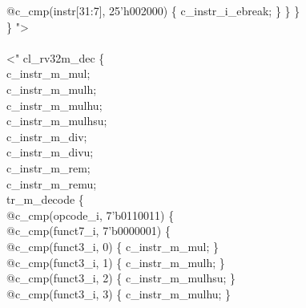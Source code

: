 {\indent \hspace{\parindent} \hspace{\parindent} @c\_cmp(instr[31:7], 25'h002000) \{ c\_instr\_i\_ebreak; \} \} \}\\%
\noindent \} "\textgreater\\%
\\
\noindent \textless" cl\_rv32m\_dec \{\\%
\indent c\_instr\_m\_mul;\\%
\indent c\_instr\_m\_mulh;\\%
\indent c\_instr\_m\_mulhu;\\%
\indent c\_instr\_m\_mulhsu;\\%
\indent c\_instr\_m\_div;\\%
\indent c\_instr\_m\_divu;\\%
\indent c\_instr\_m\_rem;\\%
\indent c\_instr\_m\_remu;\\%
\indent tr\_m\_decode \{\\%
\indent @c\_cmp(opcode\_i, 7'b0110011) \{\\%
\indent \hspace{\parindent} @c\_cmp(funct7\_i, 7'b0000001) \{ \\%
\indent \hspace{\parindent} \hspace{\parindent} @c\_cmp(funct3\_i, 0) \{ c\_instr\_m\_mul; \}\\%
\indent \hspace{\parindent} \hspace{\parindent} @c\_cmp(funct3\_i, 1) \{ c\_instr\_m\_mulh; \}\\%
\indent \hspace{\parindent} \hspace{\parindent} @c\_cmp(funct3\_i, 2) \{ c\_instr\_m\_mulhsu; \}\\%
\indent \hspace{\parindent} \hspace{\parindent} @c\_cmp(funct3\_i, 3) \{ c\_instr\_m\_mulhu; \}\\%
}
